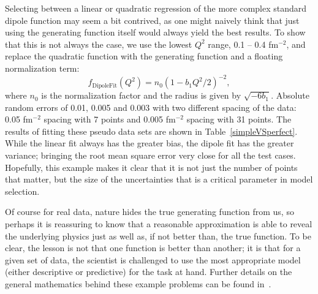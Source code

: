 \documentclass[10pt,aps,prc,twocolumn]{revtex4-1}
\begin{document}
Selecting between a linear or quadratic regression of the more complex standard dipole function may seem 
a bit contrived, as one might naively think that just using the generating function itself would always yield the
best results.   To show that this is not always the case, 
we use the lowest $Q^2$ range, 0.1 -- 0.4 fm$^{-2}$, and replace the quadratic function 
with the generating function and a floating normalization term:
\begin{equation}
\label{eq:fitdipole}
f_{{\mathrm{Dipole Fit}}}(Q^2) =  n_0 ( 1 - b_1 Q^2 / 2)^{-2},
\end{equation}
where $n_0$ is the normalization factor and the radius is given by $\sqrt{-6 b_1}$.
Absolute random errors of 0.01, 0.005 and 0.003 with two different spacing of the data: 
0.05 fm$^{-2}$ spacing with 7 points and 0.005 fm$^{-2}$ 
spacing with 31 points.       
The results of fitting these pseudo data sets are shown in Table~\ref{simpleVSperfect}.    
While the linear fit always has the greater bias, the dipole fit has the greater 
variance; bringing the root mean square error very close for all the test cases.   
Hopefully, this example makes it clear that it is not just the number of points that matter, 
but the size of the uncertainties that is a critical parameter in model selection.

Of course for real data, nature hides the true generating function from us, so perhaps it is reassuring to know
that a reasonable approximation is able to reveal the underlying physics just as well as, if not better than, the
true function.   
To be clear, the lesson is not that one function is better than another; it is that for a given set of data,
the scientist is challenged to use the most appropriate model (either descriptive or predictive) for
the task at hand.   Further details on the general mathematics behind these example problems can be 
found in~\cite{Shmueli:2010}.    
\end{document}
